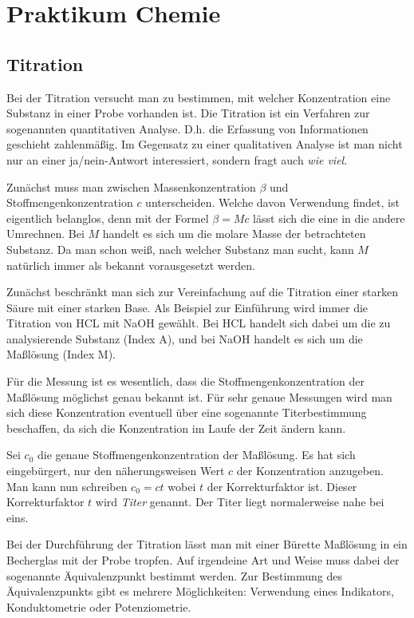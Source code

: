 \documentclass[a4paper,11pt,fleqn,twocolumn]{article}
\begin{document}
\thispagestyle{empty}
\section*{Praktikum Chemie}
\subsection*{Titration}

Bei der Titration versucht man zu bestimmen, mit welcher Konzentration
eine Substanz in einer Probe vorhanden ist. Die Titration ist
ein Verfahren zur sogenannten quantitativen Analyse. D.h. die
Erfassung von Informationen geschieht zahlenmäßig. Im Gegensatz zu
einer qualitativen Analyse ist man nicht nur an einer ja/nein-Antwort
interessiert, sondern fragt auch \textit{wie viel}.

Zunächst muss man zwischen Massenkonzentration $\beta$ und
Stoffmengenkonzentration $c$ unterscheiden. Welche davon Verwendung
findet,
ist eigentlich belanglos, denn mit der Formel $\beta = Mc$ lässt
sich die eine in die andere Umrechnen. Bei $M$ handelt es sich
um die molare Masse der betrachteten Substanz. Da man schon weiß,
nach welcher Substanz man sucht, kann $M$ natürlich immer
als bekannt vorausgesetzt werden.

Zunächst beschränkt man sich zur Vereinfachung auf die Titration
einer starken Säure mit einer starken Base. Als Beispiel zur
Einführung wird immer die Titration von HCL mit NaOH gewählt.
Bei HCL handelt sich dabei um die zu analysierende Substanz (Index A),
und bei NaOH handelt es sich um die Maßlösung (Index M).

Für die Messung ist es wesentlich, dass die Stoffmengenkonzentration
der Maßlösung möglichst genau bekannt ist. Für sehr genaue Messungen
wird man sich diese Konzentration eventuell über eine sogenannte
Titerbestimmung beschaffen, da sich die Konzentration im Laufe
der Zeit ändern kann.

Sei $c_0$ die genaue Stoffmengenkonzentration der Maßlösung. Es hat sich
eingebürgert, nur den näherungsweisen Wert $c$ der Konzentration
anzugeben. Man kann nun schreiben $c_0=ct$ wobei $t$ der
Korrekturfaktor ist. Dieser Korrekturfaktor $t$ wird \emph{Titer}
genannt. Der Titer liegt normalerweise nahe bei eins.

Bei der Durchführung der Titration lässt man mit einer Bürette Maßlösung
in ein Becherglas mit der Probe tropfen. Auf irgendeine Art und
Weise muss dabei der sogenannte Äquivalenzpunkt bestimmt werden.
Zur Bestimmung des Äquivalenzpunkts gibt es mehrere Möglichkeiten:
Verwendung eines Indikators, Konduktometrie oder Potenziometrie.
\end{document}
